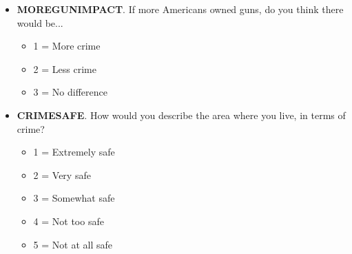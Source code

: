 \documentclass[11pt]{article}
\begin{document}
\begin{itemize}
    \item \textbf{MOREGUNIMPACT}. If more Americans owned guns, do you think there would be...
    \begin{itemize}
        \item 1 = More crime
        \item 2 = Less crime
        \item 3 = No difference
    \end{itemize}
    
    \item \textbf{CRIMESAFE}. How would you describe the area where you live, in terms of crime?
    \begin{itemize}
        \item 1 = Extremely safe
        \item 2 = Very safe
        \item 3 = Somewhat safe
        \item 4 = Not too safe
        \item 5 = Not at all safe
    \end{itemize}
\end{itemize}
\end{document}
